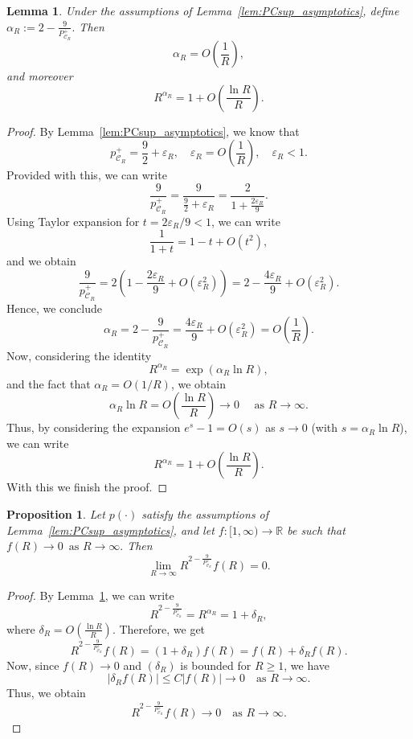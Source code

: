 \documentclass[a4paper,12pt]{amsart}
\theoremstyle{definition}
\theoremstyle{plain}
\newtheorem{proposition}{Proposition}[section]
\newtheorem{lemma}{Lemma}[section]
\begin{document}
\begin{lemma}\label{lem:exponent_control}
Under the assumptions of Lemma~\ref{lem:PCsup_asymptotics}, define $\alpha_R := 2 - \frac{9}{P_{\mathcal{C}_R}^+}.$ 
Then
\[
\alpha_R = O\!\left(\frac{1}{R}\right),
\]
and moreover
\[
R^{\alpha_R} = 1 + O\!\left(\frac{\ln R}{R}\right).
\]
\end{lemma}

\begin{proof}
By Lemma~\ref{lem:PCsup_asymptotics}, we know that 
\[
p_{\mathcal{C}_R}^+ = \frac{9}{2} + \varepsilon_R, \quad \varepsilon_R = O\!\left(\frac{1}{R}\right), \quad \varepsilon_R  <1.
\]
Provided with this, we can write  
\[
\frac{9}{p_{\mathcal{C}_R}^+}
= \frac{9}{\frac{9}{2} + \varepsilon_R}
= \frac{2}{1 + \frac{2\varepsilon_R}{9}}.
\]
Using Taylor expansion for $t= {2\varepsilon_R}/ {9}<1$, we can write
\[
\frac{1}{1+t} = 1 - t + O(t^2),
\]
and we obtain
\[
\frac{9}{p_{\mathcal{C}_R}^+}
= 2 \left( 1 - \frac{2\varepsilon_R}{9} + O(\varepsilon_R^2) \right)
= 2 - \frac{4\varepsilon_R}{9} + O(\varepsilon_R^2).
\]
Hence, we conclude 
\[
\alpha_R 
=
 2 - \frac{9}{p_{\mathcal{C}_R}^+}
= \frac{4\varepsilon_R}{9} + O(\varepsilon_R^2)
= O\!\left(\frac{1}{R}\right).
\]
Now, considering the identity 
\[
R^{\alpha_R} = \exp(\alpha_R \ln R),
\]
and the fact that $\alpha_R = O(1/R)$, we obtain  
\[
\alpha_R \ln R = O\!\left(\frac{\ln R}{R}\right) \to 0
\quad  \text{ as } R \to \infty.
\]
Thus, by  considering the expansion $e^s -1=  O(s)$ as $s \to 0$ (with $s=\alpha_R \ln R$),  we can write 
\[
R^{\alpha_R} = 1 + O\!\left(\frac{\ln R}{R}\right).
\]
With this we finish the proof. 
\end{proof}

\begin{proposition}\label{prop:main_limit_thmover}
Let $p(\cdot)$ satisfy the assumptions of Lemma~\ref{lem:PCsup_asymptotics}, and let
$f:[1,\infty) \to \mathbb{R}$ be such that $
f(R) \to 0 \,  \text{ as } R \to \infty.$ 
Then
\[
\lim_{R\to\infty} R^{2 - \frac{9}{P_{\mathcal{C}_R}^+}} f(R) = 0.
\]
\end{proposition}

\begin{proof}
By Lemma~\ref{lem:exponent_control}, we can write
\[
R^{2 - \frac{9}{P_{\mathcal{C}_R}^+}} = R^{\alpha_R}
= 1 + \delta_R,
\]
where $\delta_R = O\!\left(\frac{\ln R}{R}\right)$.
Therefore,  we get 
\[
R^{2 - \frac{9}{P_{\mathcal{C}_R}^+}} f(R)
= (1 + \delta_R) f(R)
= f(R) + \delta_R f(R).
\]
Now, since $f(R) \to 0$ and $(\delta_R)$ is bounded for $R\geq 1$, we have
\[
|\delta_R f(R)| \le C |f(R)| \to 0 \quad \text{as } R \to \infty.
\]
Thus, we obtain
\[
R^{2 - \frac{9}{P_{\mathcal{C}_R}^+}} f(R) \to 0 \quad \text{as } R \to \infty
.
\]
\end{proof}
 
\end{document}
